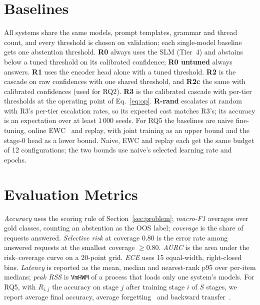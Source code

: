 \documentclass[11pt,a4paper]{article}
\begin{document}
\section{Baselines}\label{sec:baselines}

All systems share the same models, prompt templates, grammar and thread count, and every threshold is chosen on
validation; each single-model baseline gets one abstention threshold.
\textbf{R0} always uses the SLM (Tier~4) and abstains below a tuned threshold on its calibrated confidence;
\textbf{R0 untuned} always answers. \textbf{R1} uses the encoder head alone with a tuned threshold.
\textbf{R2} is the cascade on raw confidences with one shared threshold, and \textbf{R2c} the same with calibrated
confidences (used for RQ2). \textbf{R3} is the calibrated cascade with per-tier thresholds at the operating point of
Eq.~\eqref{eq:op}. \textbf{R-rand} escalates at random with R3's per-tier escalation rates, so its expected cost
matches R3's; its accuracy is an expectation over at least 1\,000 seeds. For RQ5 the baselines are naive fine-tuning,
online EWC~\citep{kirkpatrick2017ewc} and replay, with joint training as an upper bound and the stage-0 head as a lower
bound. Naive, EWC and replay each get the same budget of 12 configurations; the two bounds use naive's selected
learning rate and epochs.

\section{Evaluation Metrics}\label{sec:metrics}

\emph{Accuracy} uses the scoring rule of Section~\ref{sec:problem}; \emph{macro-F1} averages over gold classes, counting
an abstention as the OOS label; \emph{coverage} is the share of requests answered. \emph{Selective risk} at coverage
0.80 is the error rate among answered requests at the smallest coverage $\ge 0.80$. \emph{AURC} is the area under the
risk--coverage curve on a 20-point grid. \emph{ECE} uses 15 equal-width, right-closed bins. \emph{Latency} is reported
as the mean, median and nearest-rank p95 over per-item medians; \emph{peak RSS} is \texttt{VmHWM} of a process that
loads only one system's models. For RQ5, with $R_{i,j}$ the accuracy on stage $j$ after training stage $i$ of $S$
stages, we report average final accuracy, average forgetting~\citep{chaudhry2018riemannian} and backward
transfer~\citep{lopezpaz2017gem}.
\end{document}
